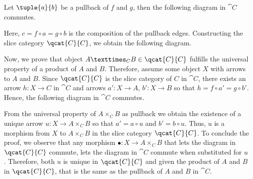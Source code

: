 
Let $\tuple{a}{b}$ be a pullback of $f$ and $g$, then the following diagram in $\cat{C}$ commutes.


Here, $c = f ∘ a = g ∘ b$ is the composition of the pullback edges. Constructing the slice category $\qcat{C}{C}$, we obtain the following diagram.


Now, we prove that object $A ×_C B \in \qcat{C}{C}$ fulfills the universal property of a product of $A$ and $B$. Therefore, assume some object $X$ with arrows to $A$ and $B$. Since $\qcat{C}{C}$ is the slice category of $C$ in $\cat{C}$, there exists an arrow $h : X → C$ in $\cat{C}$ and arrows $a' : X → A$, $b' : X → B$ so that $h = f ∘ a' = g ∘ b'$. Hence, the following diagram in $\cat{C}$ commutes.


From the universal property of $A ×_C B$ as pullback we obtain the existence of a unique arrow $u : X → A ×_C B$ so that $a' = a ∘ u$ and $b' = b ∘ u$. Thus, $u$ is a morphism from $X$ to $A ×_C B$ in the slice category $\qcat{C}{C}$. To conclude the proof, we observe that any morphism $• : X → A ×_C B$ that lets the diagram in $\qcat{C}{C}$ commute, lets the diagram in $\cat{C}$ commute when substituted for $u$. Therefore, both $u$ is unique in $\qcat{C}{C}$ and given the product of $A$ and $B$ in $\qcat{C}{C}$, that is the same as the pullback of $A$ and $B$ in $\cat{C}$.
